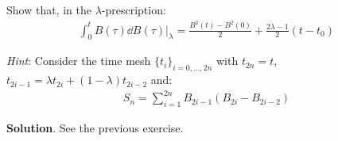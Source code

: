 \documentclass[../template.tex]{subfiles}
\begin{document}
\begin{exo}
    Show that, in the $\lambda$-prescription:
    \begin{align*}
        \int_{0}^t B(\tau) \dd{B(\tau)} \Big|_{\lambda} = \frac{B^2(t)-B^2(0)}{2} + \frac{2 \lambda -1}{2} (t-t_0)   
    \end{align*}

    \medskip

    \textit{Hint}: Consider the time mesh $\{t_i\}_{i=0,\dots,2n}$ with $t_{2n} = t$, $t_{2i-1} = \lambda t_{2i} + (1-\lambda) t_{2i-2}$ and:
    \begin{align*}
        S_n = \sum_{i=1}^{2n} B_{2i-1} (B_{2i} - B_{2i-2})
    \end{align*} 

    \medskip

    \textbf{Solution}. See the previous exercise. 

\end{exo}
\end{document}
